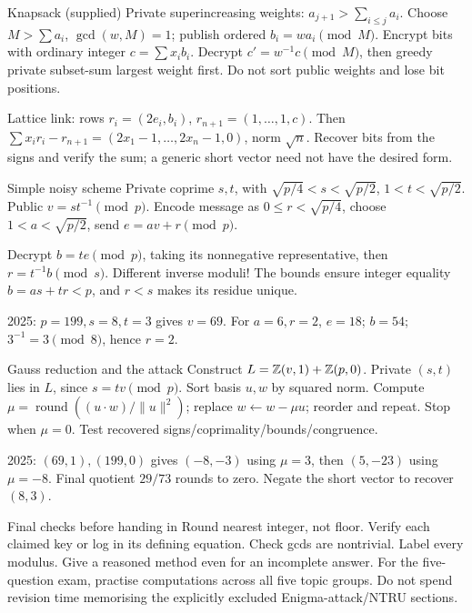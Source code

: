 \documentclass[11pt,a4paper]{article}
\begin{document}
\begin{method}{Knapsack (supplied)}
Private superincreasing weights: \(a_{j+1}>\sum_{i\le j}a_i\). Choose \(M>\sum a_i\), \(\gcd(w,M)=1\); publish ordered \(b_i=wa_i\pmod M\). Encrypt bits with ordinary integer \(c=\sum x_ib_i\). Decrypt \(c'=w^{-1}c\pmod M\), then greedy private subset-sum largest weight first. Do not sort public weights and lose bit positions.

Lattice link: rows \(r_i=(2e_i,b_i)\), \(r_{n+1}=(1,\ldots,1,c)\). Then \(\sum x_ir_i-r_{n+1}=(2x_1-1,\ldots,2x_n-1,0)\), norm \(\sqrt n\). Recover bits from the signs and verify the sum; a generic short vector need not have the desired form.
\end{method}
\begin{method}{Simple noisy scheme}
Private coprime \(s,t\), with \(\sqrt{p/4}<s<\sqrt{p/2}\), \(1<t<\sqrt{p/2}\). Public \(v=st^{-1}\pmod p\). Encode message as \(0\le r<\sqrt{p/4}\), choose \(1<a<\sqrt{p/2}\), send \(e=av+r\pmod p\).

Decrypt \(b=te\pmod p\), taking its nonnegative representative, then \(r=t^{-1}b\pmod s\). Different inverse moduli! The bounds ensure integer equality \(b=as+tr<p\), and \(r<s\) makes its residue unique.

2025: \(p=199,s=8,t=3\) gives \(v=69\). For \(a=6,r=2\), \(e=18\); \(b=54\); \(3^{-1}=3\pmod8\), hence \(r=2\).
\end{method}
\begin{method}{Gauss reduction and the attack}
Construct \(L=\mathbb Z(v,1)+\mathbb Z(p,0)\). Private \((s,t)\) lies in \(L\), since \(s=tv\pmod p\). Sort basis \(u,w\) by squared norm. Compute \(\mu=\operatorname{round}((u\cdot w)/\|u\|^2)\); replace \(w\leftarrow w-\mu u\); reorder and repeat. Stop when \(\mu=0\). Test recovered signs/coprimality/bounds/congruence.

2025: \((69,1),(199,0)\) gives \((-8,-3)\) using \(\mu=3\), then \((5,-23)\) using \(\mu=-8\). Final quotient \(29/73\) rounds to zero. Negate the short vector to recover \((8,3)\).
\end{method}
\begin{tip}{Final checks before handing in}
Round nearest integer, not floor. Verify each claimed key or log in its defining equation. Check gcds are nontrivial. Label every modulus. Give a reasoned method even for an incomplete answer. For the five-question exam, practise computations across all five topic groups. Do not spend revision time memorising the explicitly excluded Enigma-attack/NTRU sections.
\end{tip}
\end{document}
